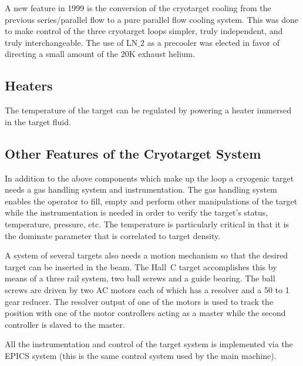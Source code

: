 A new feature in 1999 is the conversion of the cryotarget cooling from
the previous series/parallel flow to a pure parallel flow cooling
system.  This was done to make control of the three cryotarget loops
simpler, truly independent, and truly interchangeable.  The use of
LN$\_2$ as a precooler was elected in favor of directing a small
amount of the 20K exhaust helium.  

\subsection{Heaters} The temperature of the target can be regulated by powering
a heater immersed in the target fluid.

\subsection{Other Features of the Cryotarget System}  In addition to the above components which make up the loop a cryogenic target
needs a gas handling system and instrumentation. The gas handling system
enables the operator to fill, empty and perform other manipulations of the
target while the instrumentation is needed in order to verify the target's
status, temperature, pressure, etc. The temperature is particularly critical
in that it is the dominate parameter that is correlated to target density.

A system of several targets also needs a motion mechanism so that the desired
target can be inserted in the beam. The Hall~C target accomplishes this by
means of a three rail system, two ball screws and a guide bearing.
The ball screws are driven by two AC motors each of which has a resolver and
a 50 to 1 gear reducer. The resolver output of one of the motors is used
to track the position with one of the motor controllers acting as a master
while the second controller is slaved to the master.

All the instrumentation and control of the target system is implemented
via the EPICS system (this is the same control system used by the main
machine).


